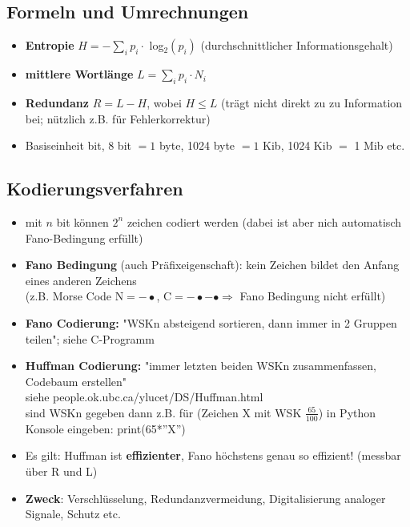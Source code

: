 \documentclass[12pt,landscape]{article}
\begin{document}
\begin{multicols}{3}
\subsection{Formeln und Umrechnungen}
\begin{itemize}
\item \textbf{Entropie} $H=-\sum_{i} p_{i}\cdot$ log$_{2}(p_{i})$ (durchschnittlicher Informationsgehalt)
\item \textbf{mittlere Wortlänge} $L=\sum _{i} p_{i}\cdot N_{i}$
\item \textbf{Redundanz} $R=L-H$, wobei $H\leq L$ (trägt nicht direkt zu  zu Information bei; nützlich z.B. für Fehlerkorrektur)
\item Basiseinheit bit, 8 bit $= 1$ byte, 1024 byte $=1$ Kib, 1024 Kib $=$ 1 Mib etc.
\end{itemize}
\subsection{Kodierungsverfahren}
\begin{itemize}
\item mit $n$ bit können $2^{n}$ zeichen codiert werden (dabei ist aber nich automatisch Fano-Bedingung erfüllt)
\item \textbf{Fano Bedingung} (auch Präfixeigenschaft): kein Zeichen bildet den Anfang eines anderen Zeichens\\ (z.B. Morse Code N$=-\bullet$, C$=-\bullet-\bullet \Rightarrow$ Fano Bedingung nicht erfüllt)
\item \textbf{Fano Codierung:} "WSKn absteigend sortieren, dann immer in 2 Gruppen teilen"; siehe C-Programm
\item \textbf{Huffman Codierung:} "immer letzten beiden WSKn zusammenfassen, Codebaum erstellen" \\ siehe people.ok.ubc.ca/ylucet/DS/Huffman.html\\ sind WSKn gegeben dann z.B. für (Zeichen X mit WSK $\frac{65}{100}$) in Python Konsole eingeben: print(65*”X”)
\item Es gilt: Huffman ist \textbf{effizienter}, Fano höchstens genau so effizient! (messbar über R und L)
\item \textbf{Zweck}: Verschlüsselung, Redundanzvermeidung, Digitalisierung analoger Signale, Schutz etc.
\end{itemize}

\end{multicols}
\end{document}
